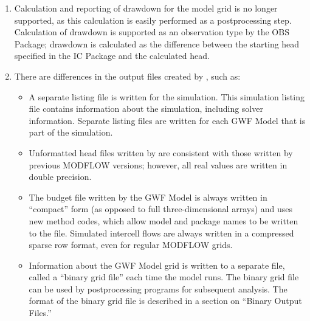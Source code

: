 \begin{enumerate}
\item Calculation and reporting of drawdown for the model grid is no longer supported, as this calculation is easily performed as a postprocessing step.  Calculation of drawdown is supported as an observation type by the OBS Package; 
drawdown is calculated as the difference between the starting head specified in the IC Package and the calculated head.

\item There are differences in the output files created by \mf, such as:
\begin{itemize}

\item A separate listing file is written for the simulation.  This simulation listing file contains information about the simulation, including solver information.  Separate listing files are written for each GWF Model that is part of the simulation.

\item Unformatted head files written by \mf are consistent with those written by previous MODFLOW versions; however, all real values are written in double precision.

\item The budget file written by the GWF Model is always written in ``compact'' form (as opposed to full three-dimensional arrays) and uses new method codes, which allow model and package names to be written to the file.  Simulated intercell flows are always written in a compressed sparse row format, even for regular MODFLOW grids.

\item Information about the GWF Model grid is written to a separate file, called a ``binary grid file'' each time the model runs.  The binary grid file can be used by postprocessing programs for subsequent analysis.  The format of the binary grid file is described in a section on ``Binary Output Files.''

\end{itemize}


\end{enumerate}
